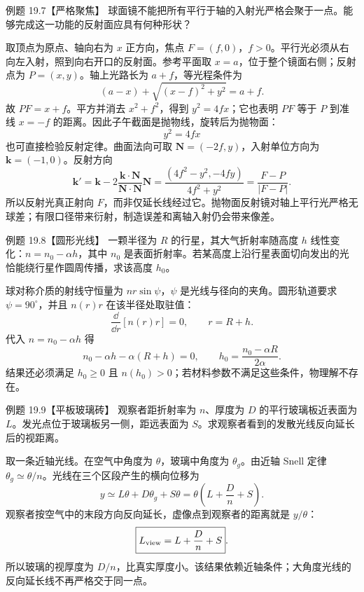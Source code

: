 \begin{origexamplebox}{例题 19.7【严格聚焦】}
球面镜不能把所有平行于轴的入射光严格会聚于一点。能够完成这一功能的反射面应具有何种形状？
\end{origexamplebox}
\begin{xesolution}
取顶点为原点、轴向右为 $x$ 正方向，焦点 $F=(f,0)$，$f>0$。平行光必须从右向左入射，照到向右开口的反射面。参考平面取 $x=a$，位于整个镜面右侧；反射点为 $P=(x,y)$。轴上光路长为 $a+f$，等光程条件为
\[
 (a-x)+\sqrt{(x-f)^2+y^2}=a+f.
\]
故 $PF=x+f$。平方并消去 $x^2+f^2$，得到 $y^2=4fx$；它也表明 $PF$ 等于 $P$ 到准线 $x=-f$ 的距离。因此子午截面是抛物线，旋转后为抛物面：
\[
 \boxed{y^2=4fx}
\]
也可直接检验反射定律。曲面法向可取 $\boldsymbol N=(-2f,y)$，入射单位方向为 $\boldsymbol k=(-1,0)$。反射方向
\[
 \boldsymbol k'=\boldsymbol k-2\frac{\boldsymbol k\cdot\boldsymbol N}{\boldsymbol N\cdot\boldsymbol N}\boldsymbol N
 =\frac{(4f^2-y^2,-4fy)}{4f^2+y^2}
 =\frac{F-P}{|F-P|}.
\]
所以反射光真正射向 $F$，而非仅延长线经过它。抛物面反射镜对轴上平行光严格无球差；有限口径带来衍射，制造误差和离轴入射仍会带来像差。
\end{xesolution}

\begin{origexamplebox}{例题 19.8【圆形光线】}
一颗半径为 $R$ 的行星，其大气折射率随高度 $h$ 线性变化：$n=n_0-\alpha h$，其中 $n_0$ 是表面折射率。若某高度上沿行星表面切向发出的光恰能绕行星作圆周传播，求该高度 $h_0$。
\end{origexamplebox}
\begin{xesolution}
球对称介质的射线守恒量为 $nr\sin\psi$，$\psi$ 是光线与径向的夹角。圆形轨道要求 $\psi=90^\circ$，并且 $n(r)r$ 在该半径处取驻值：
\[
 \frac{\dd}{\dd r}[n(r)r]=0,\qquad r=R+h.
\]
代入 $n=n_0-\alpha h$ 得
\[
 n_0-\alpha h-\alpha(R+h)=0,\qquad
 \boxed{h_0=\frac{n_0-\alpha R}{2\alpha}}.
\]
结果还必须满足 $h_0\ge0$ 且 $n(h_0)>0$；若材料参数不满足这些条件，物理解不存在。
\end{xesolution}

\begin{origexamplebox}{例题 19.9【平板玻璃砖】}
观察者距折射率为 $n$、厚度为 $D$ 的平行玻璃板近表面为 $L$。发光点位于玻璃板另一侧，距远表面为 $S$。求观察者看到的发散光线反向延长后的视距离。
\end{origexamplebox}
\begin{xesolution}
取一条近轴光线。在空气中角度为 $\theta$，玻璃中角度为 $\theta_g$。由近轴 Snell 定律 $\theta_g\simeq\theta/n$。光线在三个区段产生的横向位移为
\[
 y\simeq L\theta+D\theta_g+S\theta
  =\theta\left(L+\frac Dn+S\right).
\]
观察者按空气中的末段方向反向延长，虚像点到观察者的距离就是 $y/\theta$：
\[
 \boxed{L_{\rm view}=L+\frac Dn+S}.
\]
所以玻璃的视厚度为 $D/n$，比真实厚度小。该结果依赖近轴条件；大角度光线的反向延长线不再严格交于同一点。
\end{xesolution}

